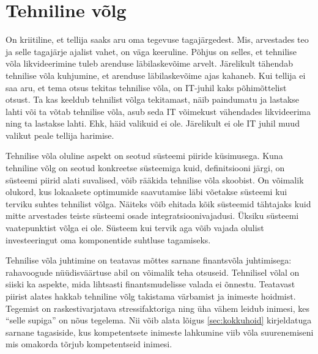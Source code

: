 \documentclass{tufte-book}
\begin{document}
\section{Tehniline võlg}
On kriitiline, et tellija saaks aru oma tegevuse tagajärgedest. Mis, arvestades teo ja selle tagajärje ajalist vahet, on väga keeruline. Põhjus on selles, et tehnilise võla likvideerimine tuleb arenduse läbilaskevõime arvelt. Järelikult tähendab tehnilise võla kuhjumine, et arenduse läbilaskevõime ajas kahaneb. Kui tellija ei saa aru, et tema otsus tekitas tehnilise võla, on IT-juhil kaks põhimõttelist otsust. Ta kas keeldub tehnilist võlga tekitamast, näib paindumatu ja lastakse lahti või ta võtab tehnilise võla, asub seda IT võimekust vähendades likvideerima ning ta lastakse lahti. Ehk, häid valikuid ei ole. Järelikult ei ole IT juhil muud valikut peale tellija harimise.

Tehnilise võla oluline aspekt on seotud süsteemi piiride küsimusega. Kuna tehniline võlg on seotud konkreetse süsteemiga kuid, definitsiooni järgi, on süsteemi piirid alati suvalised, võib rääkida tehnilise võla skoobist. On võimalik olukord, kus lokaalsete optimumide saavutamise läbi võetakse süsteemi kui terviku suhtes tehnilist võlga. Näiteks võib ehitada kõik süsteemid tähtajaks kuid mitte arvestades teiste süsteemi osade integratsioonivajadusi. Üksiku süsteemi vaatepunktist võlga ei ole. Süsteem kui tervik aga võib vajada olulist investeeringut oma komponentide suhtluse tagamiseks. 

Tehnilise võla juhtimine on teatavas mõttes sarnane finantsvõla juhtimisega: rahavoogude nüüdisväärtuse abil on võimalik teha otsuseid. Tehnilisel võlal on siiski ka aspekte, mida lihtsasti finantsmudelisse valada ei õnnestu. Teatavast piirist alates hakkab tehniline võlg takistama värbamist ja inimeste hoidmist. Tegemist on raskestivarjatava stressifaktoriga ning üha vähem leidub inimesi, kes \enquote{selle supiga} on nõus tegelema. Nii võib alata lõigus \ref{sec:kokkuhoid} kirjeldatuga sarnane tagasiside, kus kompetentsete inimeste lahkumine viib võla suurenemiseni mis omakorda tõrjub kompetentseid inimesi. 
\end{document}
